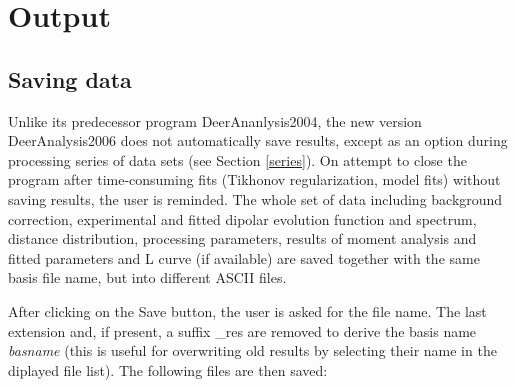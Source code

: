 \documentclass{article}
\begin{document}
\section{Output}
\subsection{Saving data}
\label{output}
Unlike its predecessor program DeerAnanlysis2004, the new version DeerAnalysis2006 does not automatically save results, except as an option during processing series of data sets (see Section \ref{series}). On attempt to close the program after time-consuming fits (Tikhonov regularization, model fits) without saving results, the user is reminded. The whole set of data including background correction, experimental and fitted dipolar evolution function and spectrum, distance distribution, processing parameters, results of moment analysis and fitted parameters and L curve (if available) are saved together with the same basis file name, but into different ASCII files. 

After clicking on the {\ttfamily Save} button, the user is asked for the file name. The last extension and, if present, a suffix {\ttfamily \_res} are removed to derive the basis name {\ttfamily \emph{basname}} (this is useful for overwriting old results by selecting their name in the diplayed file list). The following files are then saved:
\end{document}
